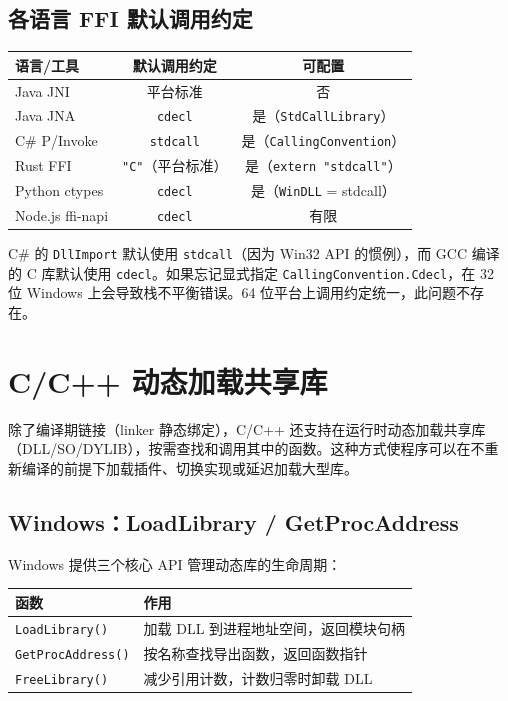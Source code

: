 \documentclass[12pt,a4paper,fontset=fandol]{ctexbook}
\newcommand{\cpp}[1]{C++#1}
\newcommand{\Fn}[1]{\texttt{#1()}}
\newcommand{\Tp}[1]{\texttt{#1}}
\begin{document}
\section*{各语言 FFI 默认调用约定}

\begin{longtable}{lcc}
\toprule
\textbf{语言/工具} & \textbf{默认调用约定} & \textbf{可配置} \\
\midrule
Java JNI        & 平台标准              & 否 \\
Java JNA        & \texttt{cdecl}        & 是（\Tp{StdCallLibrary}） \\
C\# P/Invoke    & \texttt{stdcall}      & 是（\Tp{CallingConvention}） \\
Rust FFI        & \texttt{"C"}（平台标准）& 是（\texttt{extern "stdcall"}） \\
Python ctypes   & \texttt{cdecl}        & 是（\Tp{WinDLL} = stdcall） \\
Node.js ffi-napi & \texttt{cdecl}       & 有限 \\
\bottomrule
\end{longtable}

\begin{tcolorbox}[warning={C\# P/Invoke 的默认调用约定}]
C\# 的 \Tp{DllImport} 默认使用 \texttt{stdcall}（因为 Win32 API 的惯例），而 GCC 编译的 C 库默认使用 \texttt{cdecl}。如果忘记显式指定 \texttt{CallingConvention.Cdecl}，在 32 位 Windows 上会导致栈不平衡错误。64 位平台上调用约定统一，此问题不存在。
\end{tcolorbox}


\chapter{C/C++ 动态加载共享库}

除了编译期链接（linker 静态绑定），C/\allowbreak{}\cpp{} 还支持在运行时动态加载共享库（DLL/SO/DYLIB），按需查找和调用其中的函数。这种方式使程序可以在不重新编译的前提下加载插件、切换实现或延迟加载大型库。

\section{Windows：LoadLibrary / GetProcAddress}

Windows 提供三个核心 API 管理动态库的生命周期：

\begin{longtable}{lp{8cm}}
\toprule
\textbf{函数} & \textbf{作用} \\
\midrule
\Fn{LoadLibrary}    & 加载 DLL 到进程地址空间，返回模块句柄 \\
\Fn{GetProcAddress} & 按名称查找导出函数，返回函数指针 \\
\Fn{FreeLibrary}    & 减少引用计数，计数归零时卸载 DLL \\
\bottomrule
\end{longtable}
\end{document}
